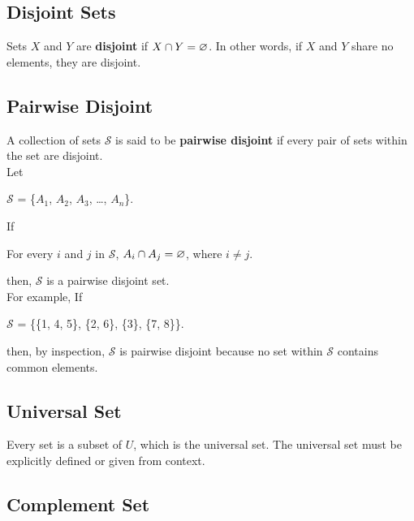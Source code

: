 \subsection*{Disjoint Sets}

Sets $X$ and $Y$ are \textbf{disjoint} if $X \cap Y = \varnothing$.  In other words, if $X$ and $Y$ share no elements, they are disjoint.

\subsection*{Pairwise Disjoint}

A collection of sets $\mathcal{S}$ is said to be \textbf{pairwise disjoint} if every pair of sets within the set are disjoint.\\

Let

\begin{center}
    $\mathcal{S}$ = \{$A_1$, $A_2$, $A_3$, \dots, $A_n$\}.
\end{center}

If

\begin{center}
    For every $i$ and $j$ in $\mathcal{S}$, $A_i \cap A_j = \varnothing$, where $i \neq j$.
\end{center}

then, $\mathcal{S}$ is a pairwise disjoint set.\\

For example, If

\begin{center}
    $\mathcal{S}$ = \{\{1, 4, 5\}, \{2, 6\}, \{3\}, \{7, 8\}\}.
\end{center}

then, by inspection, $\mathcal{S}$ is pairwise disjoint because no set within $\mathcal{S}$ contains common elements.

\subsection*{Universal Set}

Every set is a subset of $U$, which is the universal set.  The universal set must be explicitly defined or given from context.

\subsection*{Complement Set}

